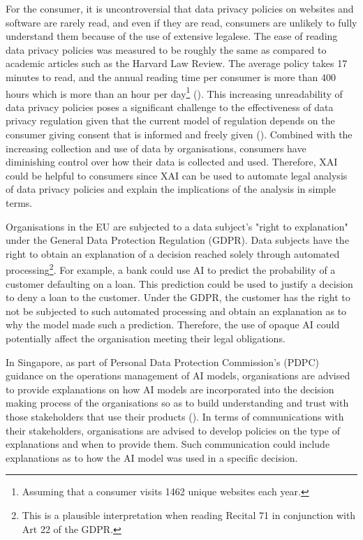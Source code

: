 For the consumer, it is uncontroversial that data privacy policies on websites and software are rarely read, and even if they are read, consumers are unlikely to fully understand them because of the use of extensive legalese. The ease of reading data privacy policies was measured to be roughly the same as compared to academic articles such as the Harvard Law Review. The average policy takes 17 minutes to read, and the annual reading time per consumer is more than 400 hours which is more than an hour per day\footnote{Assuming that a consumer visits 1462 unique websites each year.} (\cite{wagner2022privacy}). This increasing unreadability of data privacy policies poses a significant challenge to the effectiveness of data privacy regulation given that the current model of regulation depends on the consumer giving consent that is informed and freely given (\cite{mantelero_2014}). Combined with the increasing collection and use of data by organisations, consumers have diminishing control over how their data is collected and used. Therefore, XAI could be helpful to consumers since XAI can be used to automate legal analysis of data privacy policies and explain the implications of the analysis in simple terms.

Organisations in the EU are subjected to a data subject's "right to explanation" under the General Data Protection Regulation (GDPR). Data subjects have the right to obtain an explanation of a decision reached solely through automated processing\footnote{This is a plausible interpretation when reading Recital 71 in conjunction with Art 22 of the GDPR.}. For example, a bank could use AI to predict the probability of a customer defaulting on a loan. This prediction could be used to justify a decision to deny a loan to the customer. Under the GDPR, the customer has the right to not be subjected to such automated processing and obtain an explanation as to why the model made such a prediction. Therefore, the use of opaque AI could potentially affect the organisation meeting their legal obligations.

In Singapore, as part of Personal Data Protection Commission's (PDPC) guidance on the operations management of AI models, organisations are advised to provide explanations on how AI models are incorporated into the decision making process of the organisations so as to build understanding and trust with those stakeholders that use their products (\cite{ai_modelframework}). In terms of communications with their stakeholders, organisations are advised to develop policies on the type of explanations and when to provide them. Such communication could include explanations as to how the AI model was used in a specific decision. 

